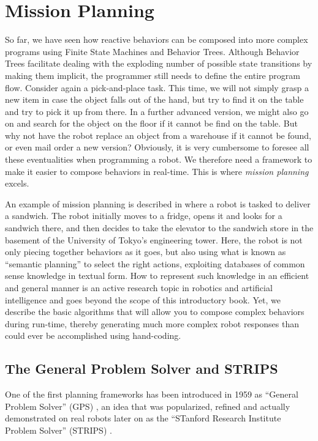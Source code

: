 \section{Mission Planning}\label{sec:strips}
So far, we have seen how reactive behaviors can be composed into more complex programs using Finite State Machines and Behavior Trees. Although Behavior Trees facilitate dealing with the exploding number of possible state transitions by making them implicit, the programmer still needs to define the entire program flow. Consider again a pick-and-place task. This time, we will not simply grasp a new item in case the object falls out of the hand, but try to find it on the table and try to pick it up from there. In a further advanced version, we might also go on and search for the object on the floor if it cannot be find on the table. But why not have the robot replace an object from a warehouse if it cannot be found, or even mail order a new version? Obviously, it is very cumbersome to foresee all these eventualities when programming a robot. We therefore need a framework to make it easier to compose behaviors in real-time. This is where \emph{mission planning} excels.

An example of mission planning is described in \cite{saito2011semantic} where a robot is tasked to deliver a sandwich. The robot initially moves to a fridge, opens it and looks for a sandwich there, and then decides to take the elevator to the sandwich store in the basement of the University of Tokyo's engineering tower. Here, the robot is not only piecing together behaviors as it goes, but also using what is known as ``semantic planning'' to select the right actions, exploiting databases of common sense knowledge in textual form. How to represent such knowledge in an efficient and general manner is an active research topic in robotics and artificial intelligence and goes beyond the scope of this introductory book. Yet, we describe the basic algorithms that will allow you to compose complex behaviors during run-time, thereby generating much more complex robot responses than could ever be accomplished using hand-coding.

\subsection{The General Problem Solver and STRIPS}
One of the first planning frameworks has been introduced in 1959 as ``General Problem Solver'' (GPS) \cite{newell1959report}, an idea that was popularized, refined and actually demonstrated on real robots later on as the ``STanford Research Institute Problem Solver'' (STRIPS) \cite{fikes1971strips}.

